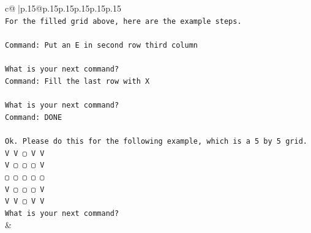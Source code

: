 \documentclass{article}
\begin{document}
{\begin{supertabular}{c@{$\;$}|p{.15\linewidth}@{}p{.15\linewidth}p{.15\linewidth}p{.15\linewidth}p{.15\linewidth}p{.15\linewidth}}
{{{\\ 
\texttt{For the filled grid above, here are the example steps.} \\
\\ 
\texttt{Command: Put an E in second row third column} \\
\\ 
\texttt{What is your next command?} \\
\texttt{Command: Fill the last row with X} \\
\\ 
\texttt{What is your next command?} \\
\texttt{Command: DONE} \\
\\ 
\texttt{Ok. Please do this for the following example, which is a 5 by 5 grid.} \\
\texttt{V V ▢ V V} \\
\texttt{V ▢ ▢ ▢ V} \\
\texttt{▢ ▢ ▢ ▢ ▢} \\
\texttt{V ▢ ▢ ▢ V} \\
\texttt{V V ▢ V V} \\
\texttt{What is your next command?} \\
            }
        }
    }
    & \\ \\


\end{supertabular}}
\end{document}
